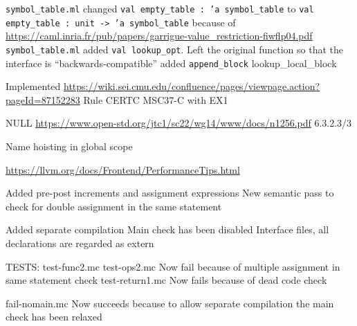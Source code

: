 
\texttt{symbol_table.ml} changed \texttt{val empty_table : 'a symbol_table} to \texttt{val empty_table : unit -> 'a symbol_table} because of \url{https://caml.inria.fr/pub/papers/garrigue-value_restriction-fiwflp04.pdf}
\texttt{symbol_table.ml} added \texttt{val lookup_opt}. Left the original function so that the interface is ``backwards-compatible''
added \texttt{append_block}
lookup_local_block

Implemented \url{https://wiki.sei.cmu.edu/confluence/pages/viewpage.action?pageId=87152283} Rule CERTC MSC37-C with EX1

NULL \url{https://www.open-std.org/jtc1/sc22/wg14/www/docs/n1256.pdf} 6.3.2.3/3

Name hoisting in global scope

\url{https://llvm.org/docs/Frontend/PerformanceTips.html}


Added pre-post increments and assignment expressions
New semantic pass to check for double assignment in the same statement

Added separate compilation
Main check has been disabled
Interface files, all declarations are regarded as extern



TESTS:
    test-func2.mc
    test-ops2.mc
        Now fail because of multiple assignment in same statement check
    test-return1.mc
        Now fails because of dead code check
    
    fail-nomain.mc
        Now succeeds because to allow separate compilation the main check has been relaxed